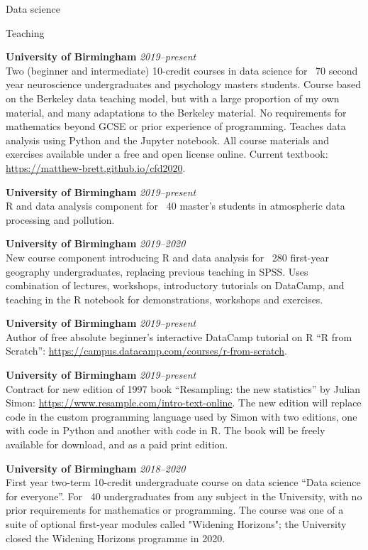 \documentclass{cv}
\newcommand{\PlaceDateNote}[3]{{\bf #1} \hfill {\em #2} \\#3}
\newcommand{\UoB}{University of Birmingham}
\begin{document}
\begin{cvSection}{Data science}

\begin{cvSubSection}{Teaching}

\PlaceDateNote{\UoB}{2019--present}
    {Two (beginner and intermediate) 10-credit courses in data science for
    ~70 second year neuroscience undergraduates and psychology masters
    students. Course based on the Berkeley data teaching model, but with a
    large proportion of my own material, and many adaptations to the Berkeley
    material.  No requirements for mathematics beyond GCSE or prior experience
    of programming.  Teaches data analysis using Python and the Jupyter
    notebook.  All course materials and exercises available under a free and
    open license online.  Current textbook:
    \url{https://matthew-brett.github.io/cfd2020}.}

\PlaceDateNote{\UoB}{2019--present}
    {R and data analysis component for ~40 master's students in atmospheric
    data processing and pollution}.

\PlaceDateNote{\UoB}{2019--2020}
    {New course component introducing R and
    data analysis for ~280 first-year geography undergraduates, replacing
    previous teaching in SPSS. Uses combination of lectures, workshops,
    introductory tutorials on DataCamp, and teaching in the R notebook for
    demonstrations, workshops and exercises.}

\PlaceDateNote{\UoB}{2019--present}
    {Author of free absolute beginner's interactive DataCamp tutorial on R ``R
    from Scratch'': \url{https://campus.datacamp.com/courses/r-from-scratch}.}

\PlaceDateNote{\UoB}{2019--present}
    {Contract for new edition of 1997 book ``Resampling: the new statistics''
    by Julian Simon: \url{https://www.resample.com/intro-text-online}.  The new
    edition will replace code in the custom programming language used by Simon
    with two editions, one with code in Python and another with code in R.  The
    book will be freely available for download, and as a paid print edition}.

\PlaceDateNote{\UoB}{2018--2020}
    {First year two-term 10-credit undergraduate course on data science ``Data
    science for everyone''.  For ~40 undergraduates from any subject in the
    University, with no prior requirements for mathematics or programming.  The
    course was one of a suite of optional first-year modules called "Widening
    Horizons"; the University closed the Widening Horizons programme in 2020.}


\end{cvSubSection}
\end{cvSection}
\end{document}
